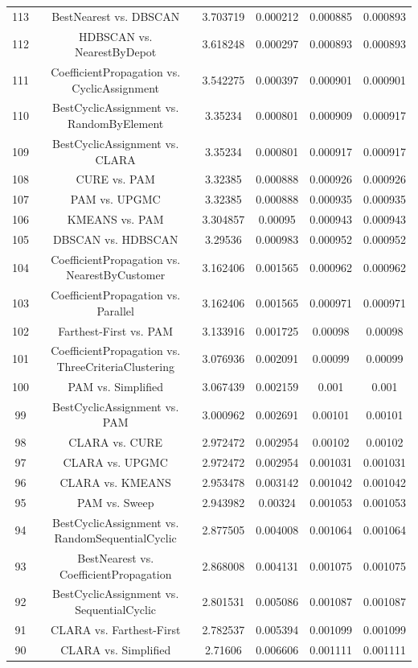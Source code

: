 \documentclass[a4paper,10pt]{article}
\begin{document}
\begin{landscape}
\begin{table}[!htp]
\begin{tabular}{cccccc}
113&BestNearest vs. DBSCAN&3.703719&0.000212&0.000885&0.000893\\
112&HDBSCAN vs. NearestByDepot&3.618248&0.000297&0.000893&0.000893\\
111&CoefficientPropagation vs. CyclicAssignment&3.542275&0.000397&0.000901&0.000901\\
110&BestCyclicAssignment vs. RandomByElement&3.35234&0.000801&0.000909&0.000917\\
109&BestCyclicAssignment vs. CLARA&3.35234&0.000801&0.000917&0.000917\\
108&CURE vs. PAM&3.32385&0.000888&0.000926&0.000926\\
107&PAM vs. UPGMC&3.32385&0.000888&0.000935&0.000935\\
106&KMEANS vs. PAM&3.304857&0.00095&0.000943&0.000943\\
105&DBSCAN vs. HDBSCAN&3.29536&0.000983&0.000952&0.000952\\
104&CoefficientPropagation vs. NearestByCustomer&3.162406&0.001565&0.000962&0.000962\\
103&CoefficientPropagation vs. Parallel&3.162406&0.001565&0.000971&0.000971\\
102&Farthest-First vs. PAM&3.133916&0.001725&0.00098&0.00098\\
101&CoefficientPropagation vs. ThreeCriteriaClustering&3.076936&0.002091&0.00099&0.00099\\
100&PAM vs. Simplified&3.067439&0.002159&0.001&0.001\\
99&BestCyclicAssignment vs. PAM&3.000962&0.002691&0.00101&0.00101\\
98&CLARA vs. CURE&2.972472&0.002954&0.00102&0.00102\\
97&CLARA vs. UPGMC&2.972472&0.002954&0.001031&0.001031\\
96&CLARA vs. KMEANS&2.953478&0.003142&0.001042&0.001042\\
95&PAM vs. Sweep&2.943982&0.00324&0.001053&0.001053\\
94&BestCyclicAssignment vs. RandomSequentialCyclic&2.877505&0.004008&0.001064&0.001064\\
93&BestNearest vs. CoefficientPropagation&2.868008&0.004131&0.001075&0.001075\\
92&BestCyclicAssignment vs. SequentialCyclic&2.801531&0.005086&0.001087&0.001087\\
91&CLARA vs. Farthest-First&2.782537&0.005394&0.001099&0.001099\\
90&CLARA vs. Simplified&2.71606&0.006606&0.001111&0.001111\\

\end{tabular}
\end{table}
\end{landscape}
\end{document}
